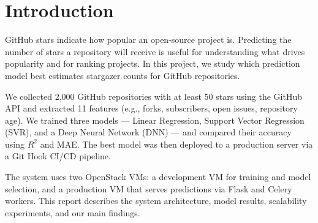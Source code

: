 \section{Introduction}

GitHub stars indicate how popular an open-source project is. Predicting the number of stars a repository will receive is useful for understanding what drives popularity and for ranking projects. In this project, we study which prediction model best estimates stargazer counts for GitHub repositories.

We collected 2{,}000 GitHub repositories with at least 50 stars using the GitHub API and extracted 11 features (e.g., forks, subscribers, open issues, repository age). We trained three models --- Linear Regression, Support Vector Regression (SVR), and a Deep Neural Network (DNN) --- and compared their accuracy using $R^2$ and MAE. The best model was then deployed to a production server via a Git Hook CI/CD pipeline.

The system uses two OpenStack VMs: a development VM for training and model selection, and a production VM that serves predictions via Flask and Celery workers. This report describes the system architecture, model results, scalability experiments, and our main findings.

